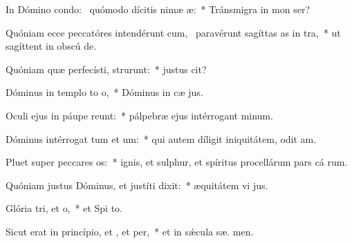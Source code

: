 \item In Dómino condo:~\pscross{} quómodo dícitis nimæ æ:~* Tránsmigra in mon  ser?
\item Quóniam ecce peccatóres intendérunt cum,~\pscross{} paravérunt sagíttas as in tra,~* ut sagíttent in obscú  de.
\item Quóniam quæ perfecísti, strurunt:~* justus   cit?
\item Dóminus in templo to o,~* Dóminus in cæ  jus.
\item Oculi ejus in páupe reunt:~* pálpebræ ejus intérrogant  minum.
\item Dóminus intérrogat tum et um:~* qui autem díligit iniquitátem, odit  am.
\item Pluet super peccares os:~* ignis, et sulphur, et spíritus procellárum pars cá rum.
\item Quóniam justus Dóminus, et justíti dixit:~* æquitátem vi  jus.
\item Glória tri, et o,~* et Spi to.
\item Sicut erat in princípio, et , et per,~* et in sǽcula sæ. men.
